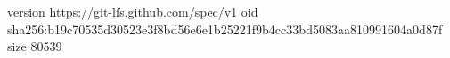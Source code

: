 version https://git-lfs.github.com/spec/v1
oid sha256:b19c70535d30523e3f8bd56e6e1b25221f9b4cc33bd5083aa810991604a0d87f
size 80539
